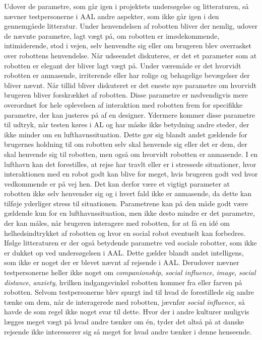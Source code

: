 Udover de parametre, som går igen i projektets undersøgelse og litteraturen, så nævner testpersonerne i AAL andre aspekter, som ikke går igen i den gennemgåede litteratur. Under henvendelsen af robotten bliver der nemlig, udover de nævnte parametre, lagt vægt på, om robotten er imødekommende, intimiderende, stod i vejen, selv henvendte sig eller om brugeren blev overrasket over robottens henvendelse. Når udseendet diskuteres, er det et parameter som at robotten er elegant der bliver lagt vægt på. Under væremåde er det hvorvidt robotten er anmasende, irriterende eller har rolige og behagelige bevægelser der bliver nævnt. Når tillid bliver diskuteret er det eneste nye parametre om hvorvidt brugeren bliver forskrækket af robotten. Disse parametre er nødvendigvis mere overordnet for hele oplevelsen af interaktion med robotten frem for specifikke parametre, der kan justeres på af en designer. Ydermere kommer disse parametre til udtryk, når testen køres i AL og har måske ikke betydning andre steder, der ikke minder om en lufthavnssituation. Dette gør sig blandt andet gældende for brugernes holdning til om robotten selv skal henvende sig eller det er dem, der skal henvende sig til robotten, men også om hvorvidt robotten er anmasende. I en lufthavn kan det forestilles, at rejse har travlt eller er i stressede situationer, hvor interaktionen med en robot godt kan blive for meget, hvis brugeren godt ved hvor vedkommende er på vej hen. Det kan derfor være et vigtigt parameter at robotten ikke selv henvender sig og i hvert fald ikke er anmasende, da dette kan tilføje yderliger stress til situationen. Parametrene kan på den måde godt være gældende kun for en lufthavnssituation, men ikke desto mindre er det parametre, der kan måles, når brugeren interagere med robotten, for at få en idé om helhedsindtrykket af robotten og hvor en social robot eventuelt kan forbedres. \blankline
%
Ifølge litteraturen er der også betydende parametre ved sociale robotter, som ikke er dukket op ved undersøgelsen i AAL. Dette gælder blandt andet intelligens, som ikke er noget der er blevet nævnt af rejsende i AAL. Derudover nævner testpersonerne heller ikke noget om \textit{companionship}, \textit{social influence}, \textit{image}, \textit{social distance}, \textit{anxiety}, hvilken indgangsvinkel robotten kommer fra eller farven på robotten. Selvom testpersonerne blev spurgt ind til hvad de forestillede sig andre tænke om dem, når de interagerede med robotten, jævnfør \textit{social influence}, så havde de som regel ikke noget svar til dette. Hvor der i andre kulturer muligvis lægges meget vægt på hvad andre tænker om én, tyder det altså på at danske rejsende ikke interesserer sig så meget for hvad andre tænker i denne henseende. 

